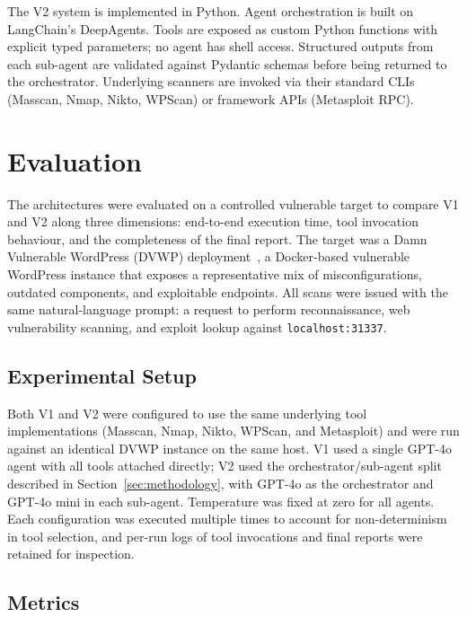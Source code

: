 \documentclass[sigconf,anonymous]{acmart}
\begin{document}
The V2 system is implemented in Python. Agent orchestration is built on LangChain's DeepAgents. Tools are exposed as custom Python functions with explicit typed parameters; no agent has shell access. Structured outputs from each sub-agent are validated against Pydantic schemas before being returned to the orchestrator. Underlying scanners are invoked via their standard CLIs (Masscan, Nmap, Nikto, WPScan) or framework APIs (Metasploit RPC).


\section{Evaluation}
\label{sec:evaluation}

The architectures were evaluated on a controlled vulnerable target to compare V1 and V2 along three dimensions: end-to-end execution time, tool invocation behaviour, and the completeness of the final report. The target was a Damn Vulnerable WordPress (DVWP) deployment~\cite{dvwp}, a Docker-based vulnerable WordPress instance that exposes a representative mix of misconfigurations, outdated components, and exploitable endpoints. All scans were issued with the same natural-language prompt: a request to perform reconnaissance, web vulnerability scanning, and exploit lookup against \texttt{localhost:31337}.

\subsection{Experimental Setup}

Both V1 and V2 were configured to use the same underlying tool implementations (Masscan, Nmap, Nikto, WPScan, and Metasploit) and were run against an identical DVWP instance on the same host. V1 used a single GPT-4o agent with all tools attached directly; V2 used the orchestrator/sub-agent split described in Section~\ref{sec:methodology}, with GPT-4o as the orchestrator and GPT-4o mini in each sub-agent. Temperature was fixed at zero for all agents. Each configuration was executed multiple times to account for non-determinism in tool selection, and per-run logs of tool invocations and final reports were retained for inspection.

\subsection{Metrics}
\end{document}
